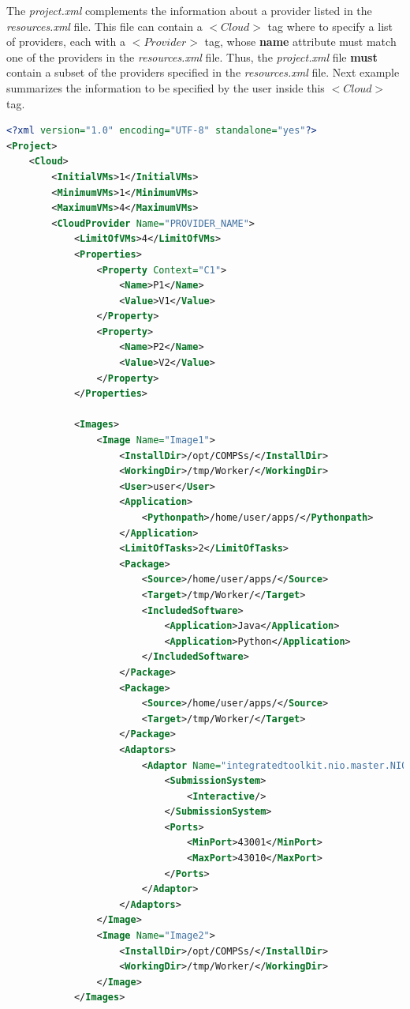 The \textit{project.xml} complements the information about a provider listed in the \textit{resources.xml} file. 
This file can contain a \textbf{$<Cloud>$} tag where to specify a list of providers, each with a \textbf{$<Provider>$} tag,
whose \textbf{name} attribute must match one of the providers in the \textit{resources.xml} file. Thus, the \textit{project.xml}
file \textbf{must} contain a subset of the providers specified in the \textit{resources.xml} file. Next example summarizes 
the information to be specified by the user inside this $<Cloud>$ tag.
\begin{lstlisting}[language=xml]
<?xml version="1.0" encoding="UTF-8" standalone="yes"?>
<Project>
    <Cloud>
        <InitialVMs>1</InitialVMs>
        <MinimumVMs>1</MinimumVMs>
        <MaximumVMs>4</MaximumVMs>
        <CloudProvider Name="PROVIDER_NAME">
            <LimitOfVMs>4</LimitOfVMs>
            <Properties>
                <Property Context="C1">
                    <Name>P1</Name>
                    <Value>V1</Value>
                </Property>
                <Property>
                    <Name>P2</Name>
                    <Value>V2</Value>
                </Property>
            </Properties>
            
            <Images>
                <Image Name="Image1">
                    <InstallDir>/opt/COMPSs/</InstallDir>
                    <WorkingDir>/tmp/Worker/</WorkingDir>
                    <User>user</User>
                    <Application>
                        <Pythonpath>/home/user/apps/</Pythonpath>
                    </Application>
                    <LimitOfTasks>2</LimitOfTasks>
                    <Package>
                        <Source>/home/user/apps/</Source>
                        <Target>/tmp/Worker/</Target>
                        <IncludedSoftware>
                            <Application>Java</Application>
                            <Application>Python</Application>
                        </IncludedSoftware>
                    </Package>
                    <Package>
                        <Source>/home/user/apps/</Source>
                        <Target>/tmp/Worker/</Target>
                    </Package>
                    <Adaptors>
                        <Adaptor Name="integratedtoolkit.nio.master.NIOAdaptor">
                            <SubmissionSystem>
                                <Interactive/>
                            </SubmissionSystem>
                            <Ports>
                                <MinPort>43001</MinPort>
                                <MaxPort>43010</MaxPort>
                            </Ports>
                        </Adaptor>
                    </Adaptors>
                </Image>
                <Image Name="Image2">
                    <InstallDir>/opt/COMPSs/</InstallDir>
                    <WorkingDir>/tmp/Worker/</WorkingDir>
                </Image>
            </Images>
            

\end{lstlisting}
